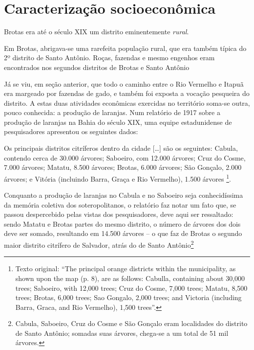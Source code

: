 \section{Caracterização socioeconômica}\label{sec:2.2}

Brotas era até o século XIX um distrito eminentemente \textit{rural}.

\begin{citacao}
Em Brotas, abrigava-se uma rarefeita população rural, que era também típica do 2º distrito de Santo Antônio. Roças, fazendas e mesmo engenhos eram encontrados nos segundos distritos de Brotas e Santo Antônio \cite[p.~52]{NASCIMENTO2007}
\end{citacao}

Já se viu, em seção anterior, que todo o caminho entre o Rio Vermelho e Itapuã era margeado por fazendas de gado, e também foi exposta a vocação pesqueira do distrito. A estas duas atividades econômicas exercidas no território soma-se outra, pouco conhecida: a produção de laranjas. Num relatório de 1917 sobre a produção de laranjas na Bahia do século XIX, uma equipe estadunidense de pesquisadores apresentou os seguintes dados:

\begin{citacao}
Os principais distritos citríferos dentro da cidade [\dots] são os seguintes: Cabula, contendo cerca de 30.000 árvores; Saboeiro, com 12.000 árvores; Cruz do Cosme, 7.000 árvores; Matatu, 8.500 árvores; Brotas, 6.000 árvores; São Gonçalo, 2.000 árvores; e Vitória (incluindo Barra, Graça e Rio Vermelho), 1.500 árvores \cite[p.~3]{dorsett_orange_1917}\footnote{Texto original: ``The principal orange districts within the municipality, as shown upon the map (p. 8), are as follows: Cabulla, containing about 30,000 trees; Saboeiro, with 12,000 trees; Cruz do Cosme, 7,000 trees; Matatu, 8,500 trees; Brotas, 6,000 trees; Sao Gongalo, 2,000 trees; and Victoria (including Barra, Graca, and Rio Vermelho), 1,500 trees''.}.
\end{citacao}

Conquanto a produção de laranjas no Cabula e no Saboeiro seja conhecidíssima da memória coletiva dos soteropolitanos, o relatório faz notar um fato que, se passou despercebido pelas vistas dos pesquisadores, deve aqui ser ressaltado: sendo Matatu e Brotas partes do mesmo distrito, o número de árvores dos dois deve ser somado, resultando em 14.500 árvores -- o que faz de Brotas o segundo maior distrito citrífero de Salvador, atrás do de Santo Antônio\footnote{Cabula, Saboeiro, Cruz do Cosme e São Gonçalo eram localidades do distrito de Santo Antônio; somadas suas árvores, chega-se a um total de 51 mil árvores.}





